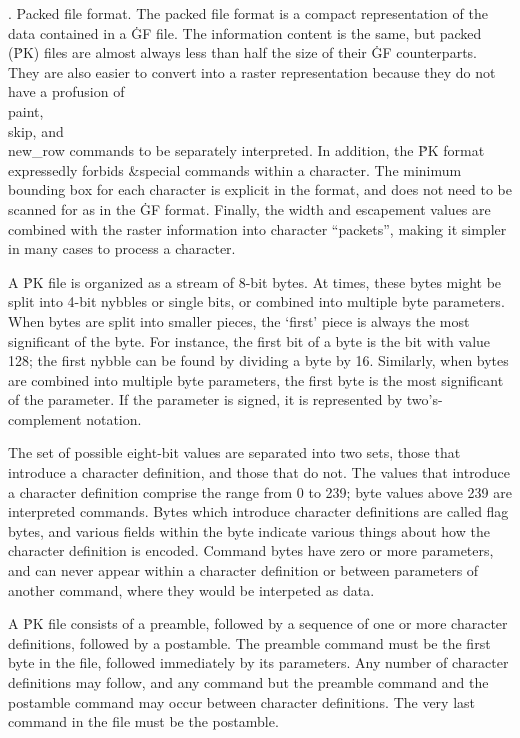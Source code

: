 .  Packed file format.
The packed file format is a compact representation of the data contained in a
\.{GF} file.  The information content is the same, but packed (\.{PK}) files
are almost always less than half the size of their \.{GF} counterparts.  They
are also easier to convert into a raster representation because they do not
have a profusion of \\{paint}, \\{skip}, and \\{new\_row} commands to be
separately interpreted.  In addition, the \.{PK} format expressedly forbids
\&{special} commands within a character.  The minimum bounding box for each
character is explicit in the format, and does not need to be scanned for as in
the \.{GF} format.  Finally, the width and escapement values are combined with
the raster information into character ``packets'', making it simpler in many
cases to process a character.

A \.{PK} file is organized as a stream of 8-bit bytes.  At times, these bytes
might be split into 4-bit nybbles or single bits, or combined into multiple
byte parameters.  When bytes are split into smaller pieces, the `first' piece
is always the most significant of the byte.  For instance, the first bit of
a byte is the bit with value 128; the first nybble can be found by dividing
a byte by 16.  Similarly, when bytes are combined into multiple byte
parameters, the first byte is the most significant of the parameter.  If the
parameter is signed, it is represented by two's-complement notation.

The set of possible eight-bit values are separated into two sets, those that
introduce a character definition, and those that do not.  The values that
introduce a character definition comprise the range from 0 to 239; byte values
above 239 are interpreted commands.  Bytes which introduce character
definitions are called flag bytes, and various fields within the byte indicate
various things about how the character definition is encoded.  Command bytes
have zero or more parameters, and can never appear within a character
definition or between parameters of another command, where they would be
interpeted as data.

A \.{PK} file consists of a preamble, followed by a sequence of one or more
character definitions, followed by a postamble.  The preamble command must
be the first byte in the file, followed immediately by its parameters.
Any number of character definitions may follow, and any command but the
preamble command and the postamble command may occur between character
definitions.  The very last command in the file must be the postamble.

